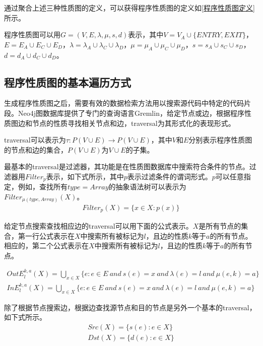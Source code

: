 {通过聚合上述三种性质图的定义，可以获得程序性质图的定义如\ref{程序性质图定义}所示。

\begin{definition}
\label{程序性质图定义}
程序性质图可以用$G=(V,E,\lambda, \mu, s, d)$表示，其中$V=V_{A} \cup \{ENTRY, EXIT\}$，$E = E_{A} \cup E_{C} \cup E_{D}$，$\lambda = \lambda_{A} \cup \lambda_{C} \cup \lambda_{D} $，$\mu = \mu_{A} \cup \mu_{C} \cup \mu_{D}$，$s = s_{A} \cup s_{C} \cup s_{D}$，$d = d_{A} \cup d_{C} \cup d_{D}$。
\end{definition}

\subsection{程序性质图的基本遍历方式}
\label{程序性质图的基本遍历方式}
生成程序性质图之后，需要有效的数据检索方法用以搜索源代码中特定的代码片段。Neo4j图数据库提供了专门的查询语言Gremlin，给定节点或边，根据程序性质图边和节点的性质寻找相关节点和边，traversal为其形式化的表现形式。

\begin{definition}
\label{traversal定义}
traversal可以表示为$\tau : P(V \cup E) \rightarrow P(V \cup E)$，其中$V$和$E$分别表示程序性质图的节点和边的集合，$P(V \cup E)$为$V \cup E$的子集。
\end{definition}

最基本的traversal是过滤器，其功能是在性质图数据库中搜索符合条件的节点。过滤器用$Filter_{p}$表示，如下式所示，其中$p$表示过滤条件的谓词形式。$p$可以任意指定，例如，查找所有$type=Array$的抽象语法树可以表示为$Filter_{\mu(type,Array)}(X)$。
\begin{align*}
Filter_{p} (X) = \{x \in X : p(x) \}
\end{align*}


给定节点搜索查找相应边的traversal可以用下面的公式表示。$X$是所有节点的集合，第一行公式表示在$X$中搜索所有被标记为$l$，且边的性质$k$等于$a$的所有节点。相应的，第二个公式表示在$X$中搜索所有被标记为$l$，且边的性质$k$等于$a$的所有节点。

\begin{align*}
OutE^{k,a}_{l}(X) = \bigcup_{x \in X} \{e: e \in E \ and\ s(e)=x \ and \ \lambda(e) = l \ and \ \mu(e,k) = a \} \\
InE^{k,a}_{l}(X) = \bigcup_{x \in X} \{e: e \in E \ and\ s(e)=x \ and \ \lambda(e) = l \ and \ \mu(e,k) = a \}
\end{align*}

除了根据节点搜索边，根据边查找源节点和目的节点是另外一个基本的traversal，如下式所示。
\begin{align*}
Src(X) = \{s(e): e \in X \} \\
Dst(X) = \{d(e): e \in X \} 
\end{align*}

}
